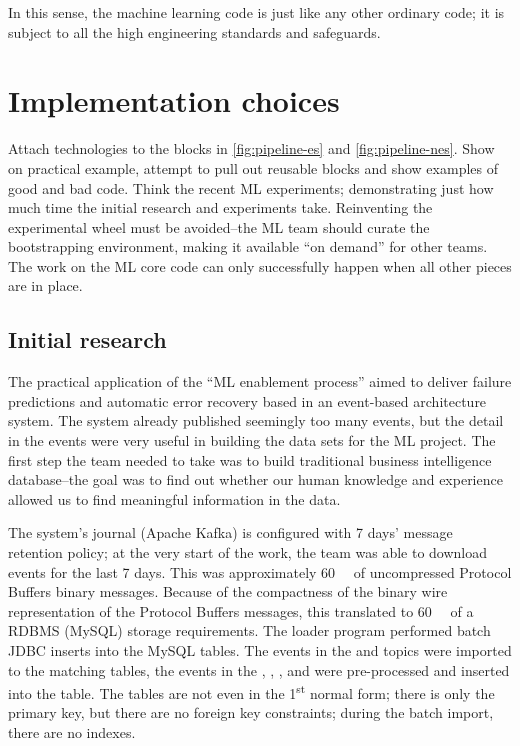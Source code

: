 In this sense, the machine learning code is just like any other ordinary code; it is subject to all the high engineering standards and safeguards.

\section{Implementation choices}
Attach technologies to the blocks in \autoref{fig:pipeline-es} and \autoref{fig:pipeline-nes}. Show on practical example, attempt to pull out reusable blocks and show examples of good and bad code. Think the recent ML experiments; demonstrating just how much time the initial research and experiments take. Reinventing the experimental wheel must be avoided--the ML team should curate the bootstrapping environment, making it available ``on demand'' for other teams. The work on the ML core code can only successfully happen when all other pieces are in place. 

\subsection{Initial research}
The practical application of the ``ML enablement process'' aimed to deliver failure predictions and automatic error recovery based in an event-based architecture system. The system already published seemingly too many events, but the detail in the events were very useful in building the data sets for the ML project. The first step the team needed to take was to build traditional business intelligence database--the goal was to find out whether our human knowledge and experience allowed us to find meaningful information in the data.

The system's journal (Apache Kafka\cite{kafka}) is configured with 7 days' message retention policy; at the very start of the work, the team was able to download events for the last 7 days. This was approximately \SI{60}{\gibi\byte} of uncompressed Protocol Buffers\cite{protobuf} binary messages. Because of the compactness of the binary wire representation of the Protocol Buffers messages, this translated to \SI{60}{\gibi\byte} of a RDBMS (MySQL\cite{mysql}) storage requirements. The loader program performed batch JDBC inserts into the MySQL tables. The events in the  and  topics were imported to the matching tables, the events in the , , , and  were pre-processed and inserted into the  table. The tables are not even in the 1\textsuperscript{st} normal form; there is only the primary key, but there are no foreign key constraints; during the batch import, there are no indexes. 

